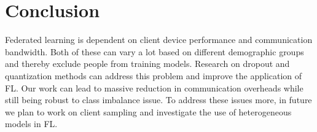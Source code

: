 \documentclass{article}
\begin{document}
\section{Conclusion}

Federated learning is dependent on client device performance and communication bandwidth. Both of these can vary a lot based on different demographic groups and thereby exclude people from training models. Research on dropout and quantization methods can address this problem and improve the application of FL. Our work can lead to massive reduction in communication overheads while still being robust to class imbalance issue. To address these issues more, in future we plan to work on client sampling and investigate the use of heterogeneous models in FL.



\end{document}
